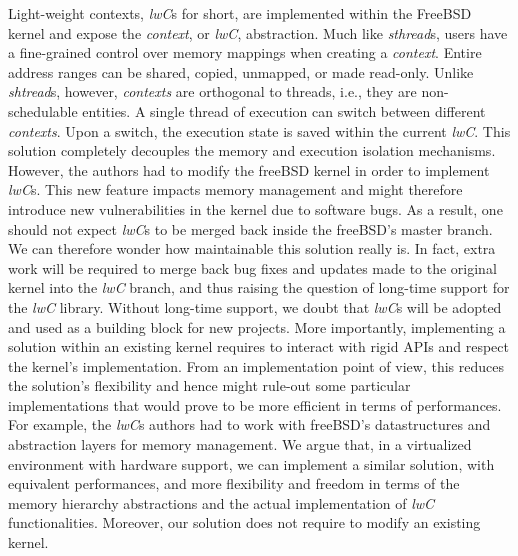 \documentclass[letterpaper,twocolumn,10pt]{article}
\begin{document}
Light-weight contexts\cite{DBLP:conf/osdi/LittonVE0BD16}, \emph{lwC}s for short, are implemented within the FreeBSD kernel and expose the \emph{context}, or \emph{lwC}, abstraction.
Much like \emph{sthread}s, users have a fine-grained control over memory mappings when creating a \emph{context}.
Entire address ranges can be shared, copied, unmapped, or made read-only.
Unlike \emph{shtread}s, however, \emph{contexts} are orthogonal to threads, i.e., they are non-schedulable entities.
A single thread of execution can switch between different \emph{contexts}.
Upon a switch, the execution state is saved within the current \emph{lwC}.
This solution completely decouples the memory and execution isolation mechanisms.
However, the authors had to modify the freeBSD kernel in order to implement \emph{lwC}s.
This new feature impacts memory management and might therefore introduce new vulnerabilities in the kernel due to software bugs.
As a result, one should not expect \emph{lwC}s to be merged back inside the freeBSD's master branch.
We can therefore wonder how maintainable this solution really is.
In fact, extra work will be required to merge back bug fixes and updates made to the original kernel into the \emph{lwC} branch, and thus raising the question of long-time support for the \emph{lwC} library.
Without long-time support, we doubt that \emph{lwC}s will be adopted and used as a building block for new projects.
More importantly, implementing a solution within an existing kernel requires to interact with rigid APIs and respect the kernel's implementation.
From an implementation point of view, this reduces the solution's flexibility and hence might rule-out some particular implementations that would prove to be more efficient in terms of performances.
For example, the \emph{lwC}s authors had to work with freeBSD's datastructures and abstraction layers for memory management.
We argue that, in a virtualized environment with hardware support, we can implement a similar solution, with equivalent performances, and more flexibility and freedom in terms of the memory hierarchy abstractions and the actual implementation of \emph{lwC} functionalities.
Moreover, our solution does not require to modify an existing kernel.
\end{document}
